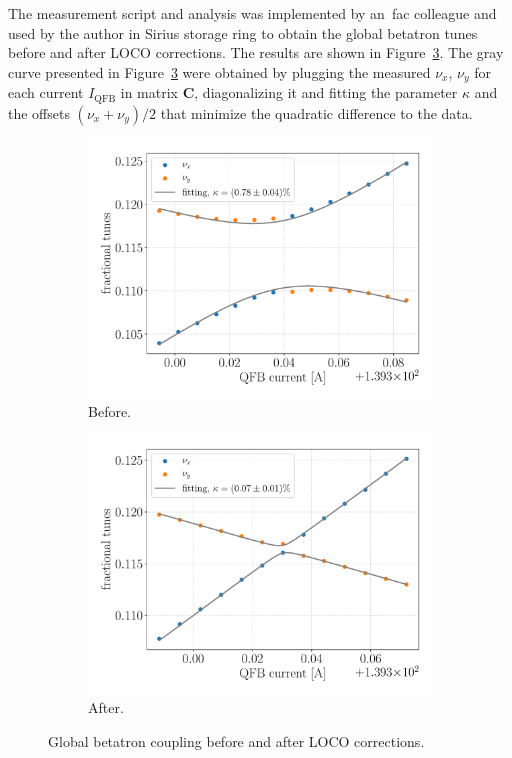 The measurement script and analysis was implemented by an~\gls{fac} colleague and used by the author in Sirius storage ring to obtain the global betatron tunes before and after LOCO corrections. The results are shown in Figure~\ref{fig:global_coupling}. The gray curve presented in Figure~\ref{fig:global_coupling} were obtained by plugging the measured $\nu_x$, $\nu_y$ for each current $I_{\mathrm{QFB}}$ in matrix $\mathbf{C}$, diagonalizing it and fitting the parameter $\kappa$ and the offsets $(\nu_x+\nu_y)/2$ that minimize the quadratic difference to the data.
\begin{figure}
\centering
\begin{subfigure}[t]{0.49\textwidth}
\includegraphics[width=1.0\textwidth]{figures/coupling_before_loco_grid_filter.pdf}
    \caption{Before.}
    \label{subfig:coup_before}
\end{subfigure}
 \begin{subfigure}[t]{0.49\textwidth}
\includegraphics[width=1.0\textwidth]{figures/coupling_after_loco_grid_filter.pdf}
    \caption{After.}
    \label{subfig:coup_after}
\end{subfigure}
\caption{Global betatron coupling before and after LOCO corrections.}
\label{fig:global_coupling}
\end{figure}

